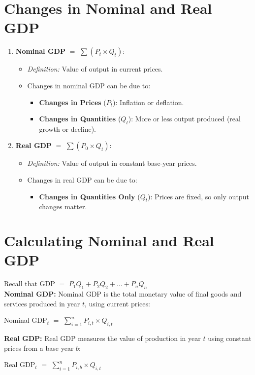 \documentclass[a4paper, 11pt]{article}
\begin{document}
\section{Changes in Nominal and Real GDP}
\begin{enumerate}
    \item \textbf{Nominal GDP} $=$ $\sum (P_t \times Q_t)$:
    \begin{itemize}
        \item \textit{Definition:} Value of output in current prices.
        \item Changes in nominal GDP can be due to:
        \begin{itemize}
            \item \textbf{Changes in Prices} ($P_t$): Inflation or deflation.
            \item \textbf{Changes in Quantities} ($Q_t$): More or less output produced (real growth or decline).
        \end{itemize}
    \end{itemize}
    \item \textbf{Real GDP} $=$ $\sum (P_0 \times Q_t)$:
    \begin{itemize}
        \item \textit{Definition:} Value of output in constant base-year prices.
        \item Changes in real GDP can be due to:
        \begin{itemize}
            \item \textbf{Changes in Quantities Only} ($Q_t$): Prices are fixed, so only output  changes matter.
        \end{itemize}
    \end{itemize}
\end{enumerate}

\section{Calculating Nominal and Real GDP}
Recall that GDP $=$ $P_1Q_1+P_2Q_2+\dots+P_nQ_n$\\[6pt]
\textbf{Nominal GDP:}
Nominal GDP is the total monetary value of final goods and services produced in year $t$, using current prices:
\begin{center}
    Nominal GDP$_t$ $=$ $\sum_{i=1}^n P_{i,t} \times Q_{i,t}$
\end{center}
\textbf{Real GDP:}
Real GDP measures the value of production in year $t$ using constant prices from a base year $b$:
\begin{center}
    Real GDP$_t$ $=$ $\sum_{i=1}^n P_{i,b} \times Q_{i,t}$
\end{center}
\end{document}
